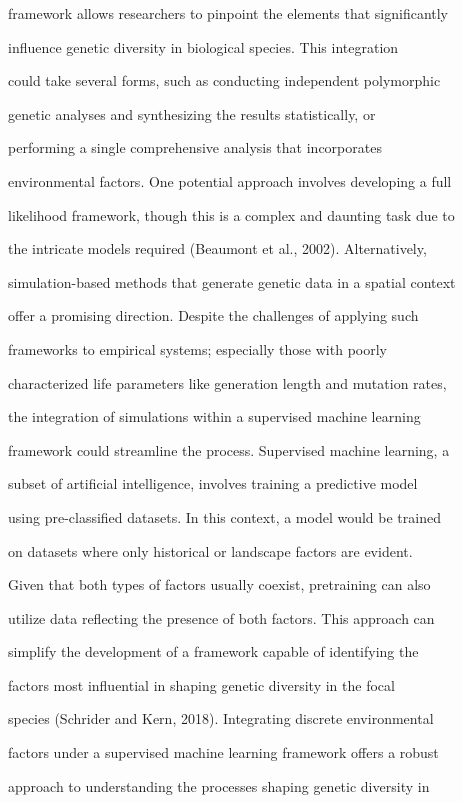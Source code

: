 \documentclass[10pt,twoside]{article}
\numberwithin{equation}{section}
\begin{document}
framework allows researchers to pinpoint the elements that significantly

influence genetic diversity in biological species. This integration

could take several forms, such as conducting independent polymorphic

genetic analyses and synthesizing the results statistically, or

performing a single comprehensive analysis that incorporates

environmental factors. One potential approach involves developing a full

likelihood framework, though this is a complex and daunting task due to

the intricate models required (Beaumont et al., 2002). Alternatively,

simulation-based methods that generate genetic data in a spatial context

offer a promising direction. Despite the challenges of applying such

frameworks to empirical systems; especially those with poorly

characterized life parameters like generation length and mutation rates,

the integration of simulations within a supervised machine learning

framework could streamline the process. Supervised machine learning, a

subset of artificial intelligence, involves training a predictive model

using pre-classified datasets. In this context, a model would be trained

on datasets where only historical or landscape factors are evident.

Given that both types of factors usually coexist, pretraining can also

utilize data reflecting the presence of both factors. This approach can

simplify the development of a framework capable of identifying the

factors most influential in shaping genetic diversity in the focal

species (Schrider and Kern, 2018). Integrating discrete environmental

factors under a supervised machine learning framework offers a robust

approach to understanding the processes shaping genetic diversity in
\end{document}
